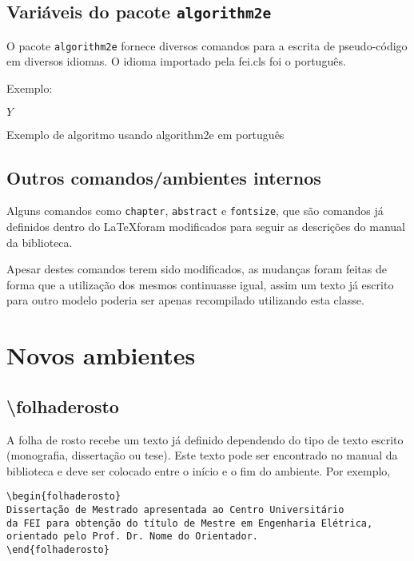 \documentclass{fei}
\begin{document}
    \subsection{Variáveis do pacote \texttt{algorithm2e}}
    
    O pacote \texttt{algorithm2e} fornece diversos comandos para a escrita de pseudo-código em diversos idiomas. O idioma importado pela fei.cls foi o português.
    
    Exemplo:
    
\begin{algorithm}


\Retorna \(Y\)

\caption{Exemplo de algoritmo usando algorithm2e em português}
\label{lst:alg}
\end{algorithm}
    
    \subsection{Outros comandos/ambientes internos}
    
    Alguns comandos como \texttt{chapter}, \texttt{abstract} e \texttt{fontsize}, que são comandos já definidos dentro do \LaTeX foram modificados para seguir as descrições do manual da biblioteca.

    Apesar destes comandos terem sido modificados, as mudanças foram feitas de forma que a utilização dos mesmos continuasse igual, assim um texto já escrito para outro modelo poderia ser apenas recompilado utilizando esta classe.

\section{Novos ambientes}

    \subsection{\textbackslash folhaderosto}
    A folha de rosto recebe um texto já definido dependendo do tipo de texto escrito (monografia, dissertação ou tese). Este texto pode ser encontrado no manual da biblioteca e deve ser colocado entre o início e o fim do ambiente. Por exemplo,
    \begin{verbatim}
\begin{folhaderosto}
Dissertação de Mestrado apresentada ao Centro Universitário
da FEI para obtenção do título de Mestre em Engenharia Elétrica, 
orientado pelo Prof. Dr. Nome do Orientador. 
\end{folhaderosto}
    \end{verbatim}
\end{document}
